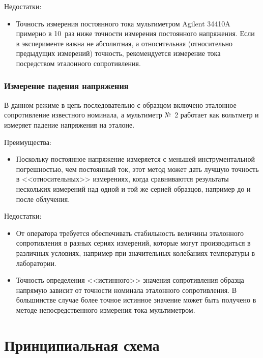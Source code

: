 \documentclass[12pt, a4paper, twocolumn]{report}
\begin{document}
Недостатки:

\begin{itemize}
\item Точность измерения постоянного тока мультиметром Agilent 34410A примерно в 10~раз ниже точности измерения постоянного напряжения. Если в эксперименте важна не абсолютная, а относительная (относительно предыдущих измерений) точность, рекомендуется измерение тока посредством эталонного сопротивления.
\end{itemize}

\subsubsection{Измерение падения напряжения}
\label{sec_test_measure}

В данном режиме в цепь последовательно с образцом включено эталонное сопротивление известного номинала, а мультиметр №~2 работает как вольтметр и измеряет падение напряжения на эталоне.

Преимущества:

\begin{itemize}
\item Поскольку постоянное напряжение измеряется с меньшей инструментальной погрешностью, чем постоянный ток, этот метод может дать лучшую точность в <<относительных>> измерениях, когда сравниваются результаты нескольких измерений над одной и той же серией образцов, например до и после облучения.
\end{itemize}

Недостатки:

\begin{itemize}
\item От оператора требуется обеспечивать стабильность величины эталонного сопротивления в разных сериях измерений, которые могут производиться в различных условиях, например при значительных колебаниях температуры в лаборатории.
\item Точность определения <<истинного>> значения сопротивления образца напрямую зависит от точности номинала эталонного сопротивления. В большинстве случае более точное истинное значение может быть получено в методе непосредственного измерения тока мультиметром.
\end{itemize}

\section{Принципиальная схема}
\end{document}
